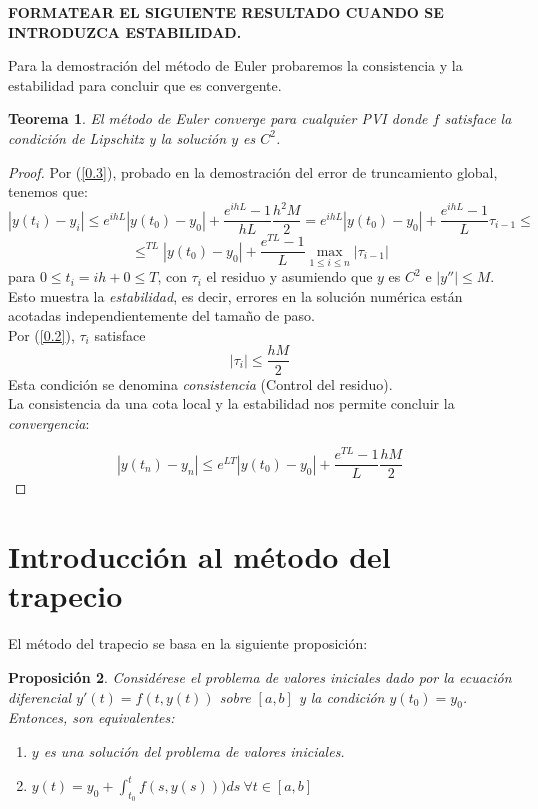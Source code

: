 \documentclass{article}
\theoremstyle{theorem-style}  %
\newtheorem{theorem}{Teorema}[section]  %
\newtheorem{proposition}[theorem]{Proposición}
\theoremstyle{definition-style}
\theoremstyle{example-style}
\begin{document}
	\textbf{FORMATEAR EL SIGUIENTE RESULTADO CUANDO SE INTRODUZCA ESTABILIDAD.}

	Para la demostración del método de Euler probaremos la consistencia y la estabilidad para concluir que es convergente.
	
	\begin{theorem}
		El método de Euler converge para cualquier PVI donde $f$ satisface la condición de Lipschitz y la solución $y$ es $C^2$.
	\end{theorem}
	
	\begin{proof}
		Por (\ref{0.3}), probado en la demostración del error de truncamiento global, tenemos que:
		$$|y(t_i)-y_i| \le e^{ihL}|y(t_0)-y_0|+\frac{e^{ihL}-1}{hL}\frac{h^2M}{2} = e^{ihL}|y(t_0)-y_0|+\frac{e^{ihL}-1}{L}\tau_{i-1} \le $$ $$ \le^{TL}|y(t_0)-y_0|+\frac{e^{TL}-1}{L}\max_{1 \le i \le n} |\tau_{i-1}|$$
		para $0 \le t_i=ih+0 \le T$, con $\tau_i$ el residuo y asumiendo que $y$ es $C^2$ e $|y''| \le M$. Esto muestra la \textit{estabilidad}, es decir, errores en la solución numérica están acotadas independientemente del tamaño de paso.\\
		
		Por (\ref{0.2}), $\tau_i$ satisface
		$$|\tau_i|\le \frac{hM}{2}$$
		Esta condición se denomina \textit{consistencia} (Control del residuo).\\
		
		La consistencia da una cota local y la estabilidad nos permite concluir la \textit{convergencia}:
		
		$$|y(t_n)-y_n| \le e^{LT}|y(t_0)-y_0|+\frac{e^{TL}-1}{L}\frac{hM}{2}$$ 
	\end{proof}
	

\section{Introducción al método del trapecio} \label{sec:intro-trapecio}

	El método del trapecio se basa en la siguiente proposición:

	\begin{proposition} \label{prop:sol-eq}
		Considérese el problema de valores iniciales dado por la ecuación diferencial $y'(t) = f(t,y(t))$ sobre $[a,b]$ y la condición $y(t_0) = y_0$.  Entonces, son equivalentes:
		\begin{enumerate}
			\item $y$ es una solución del problema de valores iniciales.
			\item $y(t) = y_0 + \int_{t_0}^{t} f(s,y(s))) ds \ \forall t \in [a,b]$
		\end{enumerate}
	\end{proposition}
	
\end{document}
